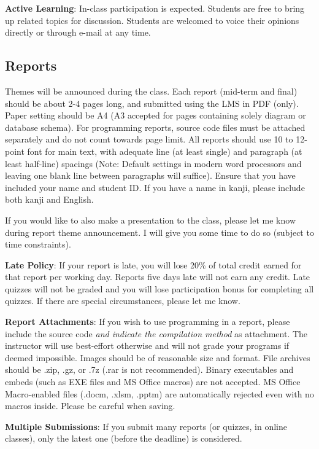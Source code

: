 \documentclass[a4paper]{article}
\begin{document}
\smallskip\noindent
\textbf{Active Learning}: In-class participation is expected. Students are free to bring up related topics for discussion. Students are welcomed to voice their opinions directly or through e-mail at any time.

\subsection{Reports}

Themes will be announced during the class. Each report (mid-term and final) should be about 2-4 pages long, and submitted using the LMS in PDF (only). Paper setting should be A4 (A3 accepted for pages containing solely diagram or database schema). For programming reports, source code files must be attached separately and do not count towards page limit. All reports should use 10 to 12-point font for main text, with adequate line (at least single) and paragraph (at least half-line) spacings (Note: Default settings in modern word processors and leaving one blank line between paragraphs will suffice). Ensure that you have included your name and student ID. If you have a name in kanji, please include both kanji and English.

If you would like to also make a presentation to the class, please let me know during report theme announcement. I will give you some time to do so (subject to time constraints).

\smallskip\noindent
\textbf{Late Policy}: If your report is late, you will lose 20\% of total credit earned for that report per working day. Reports five days late will not earn any credit. Late quizzes will not be graded and you will lose participation bonus for completing all quizzes. If there are special circumstances, please let me know.

\smallskip\noindent
\textbf{Report Attachments}: If you wish to use programming in a report, please include the source code \textit{and indicate the compilation method} as attachment. The instructor will use best-effort otherwise and will not grade your programs if deemed impossible. Images should be of reasonable size and format. File archives should be .zip, .gz, or .7z (.rar is not recommended). Binary executables and embeds (such as EXE files and MS Office macros) are not accepted. MS Office Macro-enabled files (.docm, .xlsm, .pptm) are automatically rejected even with no macros inside. Please be careful when saving.

\smallskip\noindent
\textbf{Multiple Submissions}: If you submit many reports (or quizzes, in online classes), only the latest one (before the deadline) is considered.
\end{document}
